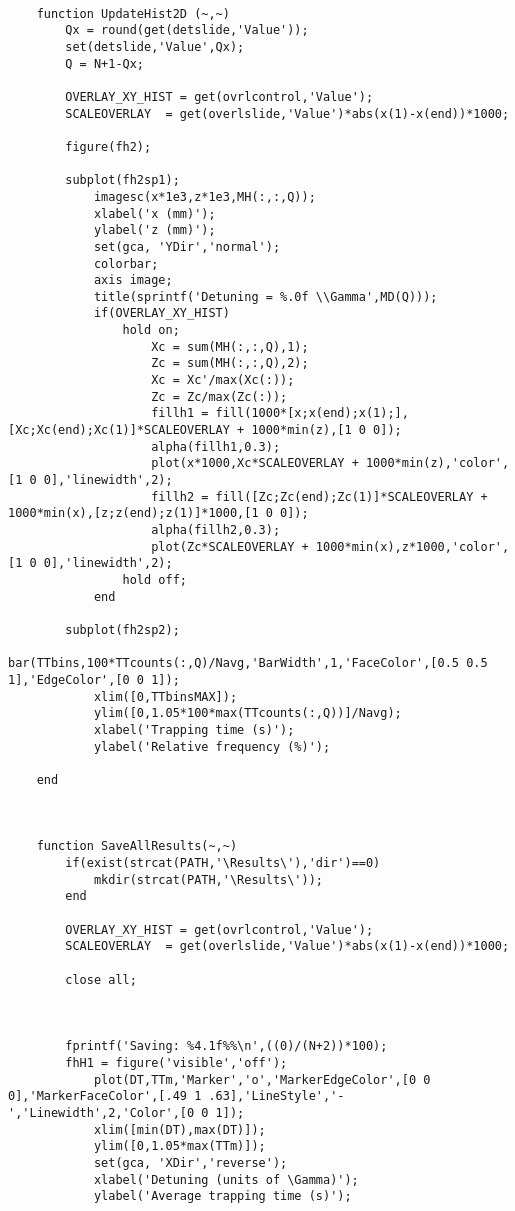 \begin{lstlisting}[style=MatlabStyle]
        
    function UpdateHist2D (~,~)
        Qx = round(get(detslide,'Value'));
        set(detslide,'Value',Qx);
        Q = N+1-Qx;
        
        OVERLAY_XY_HIST = get(ovrlcontrol,'Value');
        SCALEOVERLAY  = get(overlslide,'Value')*abs(x(1)-x(end))*1000;
        
        figure(fh2);
        
        subplot(fh2sp1);
            imagesc(x*1e3,z*1e3,MH(:,:,Q));
            xlabel('x (mm)');
            ylabel('z (mm)');
            set(gca, 'YDir','normal');
            colorbar;
            axis image;
            title(sprintf('Detuning = %.0f \\Gamma',MD(Q)));
            if(OVERLAY_XY_HIST)
                hold on;
                    Xc = sum(MH(:,:,Q),1);
                    Zc = sum(MH(:,:,Q),2);
                    Xc = Xc'/max(Xc(:));
                    Zc = Zc/max(Zc(:));
                    fillh1 = fill(1000*[x;x(end);x(1);],[Xc;Xc(end);Xc(1)]*SCALEOVERLAY + 1000*min(z),[1 0 0]);
                    alpha(fillh1,0.3);
                    plot(x*1000,Xc*SCALEOVERLAY + 1000*min(z),'color',[1 0 0],'linewidth',2);
                    fillh2 = fill([Zc;Zc(end);Zc(1)]*SCALEOVERLAY + 1000*min(x),[z;z(end);z(1)]*1000,[1 0 0]);
                    alpha(fillh2,0.3);
                    plot(Zc*SCALEOVERLAY + 1000*min(x),z*1000,'color',[1 0 0],'linewidth',2);
                hold off;
            end
            
        subplot(fh2sp2);
            bar(TTbins,100*TTcounts(:,Q)/Navg,'BarWidth',1,'FaceColor',[0.5 0.5 1],'EdgeColor',[0 0 1]);
            xlim([0,TTbinsMAX]);
            ylim([0,1.05*100*max(TTcounts(:,Q))]/Navg);
            xlabel('Trapping time (s)');
            ylabel('Relative frequency (%)');
        
    end



    function SaveAllResults(~,~)
        if(exist(strcat(PATH,'\Results\'),'dir')==0)
            mkdir(strcat(PATH,'\Results\'));
        end
        
        OVERLAY_XY_HIST = get(ovrlcontrol,'Value');
        SCALEOVERLAY  = get(overlslide,'Value')*abs(x(1)-x(end))*1000;
        
        close all;
        
        
        
        fprintf('Saving: %4.1f%%\n',((0)/(N+2))*100);
        fhH1 = figure('visible','off');
            plot(DT,TTm,'Marker','o','MarkerEdgeColor',[0 0 0],'MarkerFaceColor',[.49 1 .63],'LineStyle','-','Linewidth',2,'Color',[0 0 1]);
            xlim([min(DT),max(DT)]);
            ylim([0,1.05*max(TTm)]);
            set(gca, 'XDir','reverse');
            xlabel('Detuning (units of \Gamma)');
            ylabel('Average trapping time (s)');
            

\end{lstlisting}
